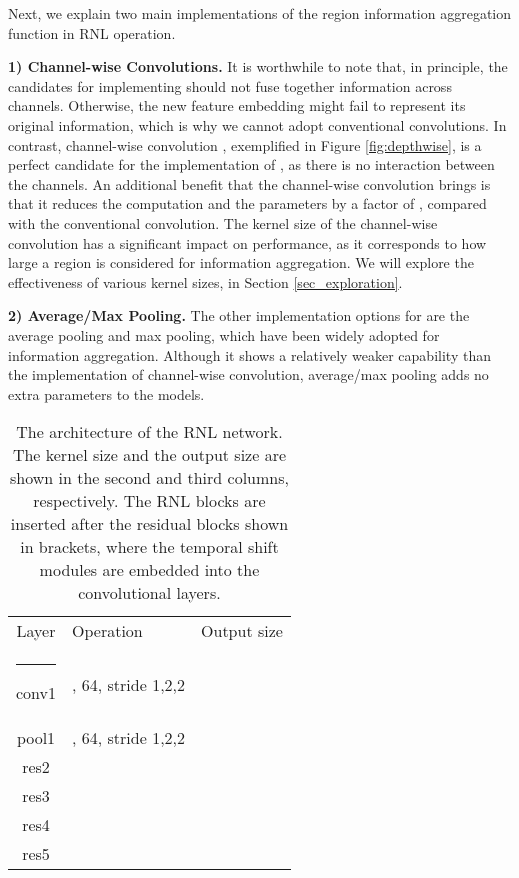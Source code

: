 \documentclass[a4paper,conference]{IEEEtran}
\makeatletter
\newcommand{\thickhline}{\noalign {\ifnum 0=`}\fi \hrule height 1pt
    \futurelet \reserved@a \@xhline
}
\makeatother
\begin{document}
Next, we explain two main implementations of the region information aggregation function  in RNL operation. 

\textbf{1) Channel-wise Convolutions.} It is worthwhile to note that, in principle, the candidates for implementing  should not fuse together information across channels. Otherwise, the new feature embedding might fail to represent its original information, which is why we cannot adopt conventional convolutions. In contrast, channel-wise convolution \cite{sandler2018mobilenetv2}, exemplified in Figure \ref{fig:depthwise}, is a perfect candidate for the implementation of , as there is no interaction between the channels. An additional benefit that the channel-wise convolution brings is that it reduces the computation and the parameters by a factor of , compared with the conventional convolution. The kernel size of the channel-wise convolution has a significant impact on performance, as it corresponds to how large a region  is considered for information aggregation. We will explore the effectiveness of various kernel sizes, in Section \ref{sec_exploration}.

\textbf{2) Average/Max Pooling.} The other implementation options for  are the average pooling and max pooling, which have been widely adopted for information aggregation. Although it shows a relatively weaker capability than the implementation of channel-wise convolution, average/max pooling adds no extra parameters to the models.
 
  
\begin{table}
\centering
\caption{The architecture of the RNL network. The kernel size  and the output size are shown in the second and third columns, respectively. The RNL blocks are inserted after the residual blocks shown in brackets, where the temporal shift modules \cite{lin2019tsm} are embedded into the convolutional layers.}
\label{tabel:archi}
\setlength{\tabcolsep}{11pt}
\begin{tabular}{c|l|c}
Layer & Operation & Output size\\
\thickhline
conv1 & , 64, stride 1,2,2&    \\
\hline
pool1 & , 64, stride 1,2,2&   \\
\hline
res2 & &   \\
\hline
res3 &  &   \\
\hline
res4 &  &   \\
\hline
res5 &  &   \\
\end{tabular}
\end{table}
\end{document}
